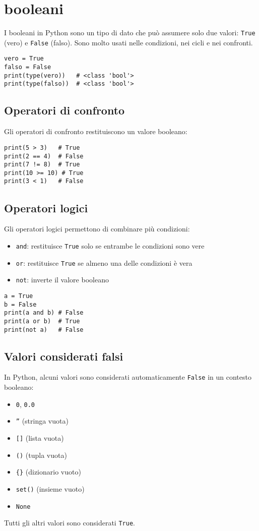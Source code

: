 \documentclass[a4paper,12pt]{article}
\begin{document}
\section{booleani}
I booleani in Python sono un tipo di dato che può assumere solo due valori: \texttt{True} (vero) e \texttt{False} (falso). Sono molto usati nelle condizioni, nei cicli e nei confronti.

\begin{lstlisting}
vero = True
falso = False
print(type(vero))   # <class 'bool'>
print(type(falso))  # <class 'bool'>
\end{lstlisting}

\subsection*{Operatori di confronto}
Gli operatori di confronto restituiscono un valore booleano:
\begin{lstlisting}
print(5 > 3)   # True
print(2 == 4)  # False
print(7 != 8)  # True
print(10 >= 10) # True
print(3 < 1)   # False
\end{lstlisting}

\subsection*{Operatori logici}
Gli operatori logici permettono di combinare più condizioni:
\begin{itemize}
    \item \texttt{and}: restituisce \texttt{True} solo se entrambe le condizioni sono vere
    \item \texttt{or}: restituisce \texttt{True} se almeno una delle condizioni è vera
    \item \texttt{not}: inverte il valore booleano
\end{itemize}
\begin{lstlisting}
a = True
b = False
print(a and b) # False
print(a or b)  # True
print(not a)   # False
\end{lstlisting}

\subsection*{Valori considerati falsi}
In Python, alcuni valori sono considerati automaticamente \texttt{False} in un contesto booleano:
\begin{itemize}
    \item \texttt{0}, \texttt{0.0}
    \item \texttt{''} (stringa vuota)
    \item \texttt{[]} (lista vuota)
    \item \texttt{()} (tupla vuota)
    \item \texttt{\{\}} (dizionario vuoto)
    \item \texttt{set()} (insieme vuoto)
    \item \texttt{None}
\end{itemize}
Tutti gli altri valori sono considerati \texttt{True}.
\end{document}
